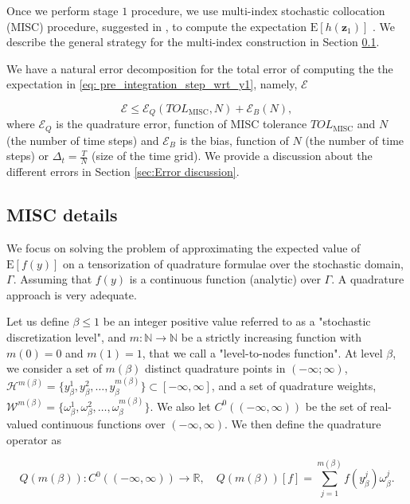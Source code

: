 \documentclass[11pt]{article}
\newcommand{\expt}[1]{\mathrm{E}\left[#1\right]}
\newcommand{\rset}{\mathbb{R}}
\newcommand{\nset}{\mathbb{N}}
\begin{document}
Once we perform stage $1$ procedure,  we use  multi-index stochastic collocation (MISC) procedure, suggested in \cite{haji2016multi}, to compute the expectation $\expt{h(\mathbf{z}_1)}$ . We describe the general strategy for the multi-index construction in Section \ref{sec:Details of the MISC}. 


We have a natural error decomposition for the total error of computing the the expectation in \eqref{eq: pre_integration_step_wrt_y1}, namely, $\mathcal{E}$

\begin{equation}\label{eq:total_error}
\mathcal{E} \le \mathcal{E}_Q(TOL_{\text{MISC}},N) + \mathcal{E}_B(N),
\end{equation}
where  $\mathcal{E}_Q$ is the quadrature error, function of MISC tolerance $TOL_{\text{MISC}}$ and $N$ (the number of time steps)  and  $\mathcal{E}_B$  is the bias, function of $N$ (the number of time steps) or $\Delta_t=\frac{T}{N}$ (size of the time grid). We provide a discussion about the different errors in Section \ref{sec:Error discussion}.
\subsection{MISC details} \label{sec:Details of the MISC}

We focus on solving the problem of  approximating the expected value of $\expt{f(y)}$ on a tensorization of quadrature formulae over the stochastic domain, $\Gamma$. Assuming that $f(y)$ is a continuous function (analytic) over $\Gamma$. A quadrature approach is very adequate.

Let us define $\beta \le 1$ be an integer positive value referred to as a "stochastic discretization level", and $m: \nset \rightarrow \nset$ be a strictly increasing function with $m(0)=0$ and $m(1)=1$, that we call a "level-to-nodes function". At level $\beta$, we consider a set of $m(\beta)$ distinct quadrature points in $(-\infty; \infty)$, $\mathcal{H}^{m(\beta)}=\{y^1_\beta,y^2_\beta,\dots,y_\beta^{m(\beta)}\} \subset [-\infty,\infty]$, and a set of quadrature weights, $\mathcal{W}^{m(\beta)}=\{\omega^1_\beta,\omega^2_\beta,\dots,\omega_\beta^{m(\beta)}\}$. We also let $C^0((-\infty,\infty))$ be the set of real-valued continuous functions over $(-\infty, \infty)$. We then define the quadrature operator as


\begin{equation}
Q(m(\beta)):C^0((-\infty,\infty)) \rightarrow \rset, \quad Q(m(\beta))[f]= \sum_{j=1}^{m(\beta)} f(y^j_\beta) \omega_\beta^j.
\end{equation}
\end{document}
